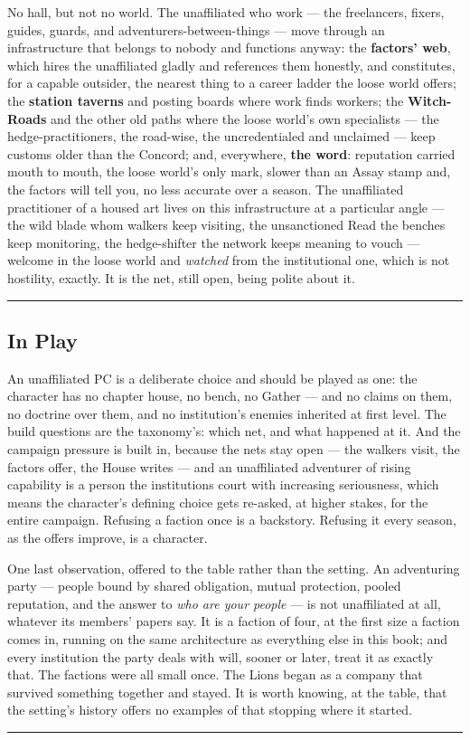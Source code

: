 No hall, but not no world. The unaffiliated who work --- the freelancers, fixers, guides, guards, and adventurers-between-things --- move through an infrastructure that belongs to nobody and functions anyway: the \textbf{factors' web}, which hires the unaffiliated gladly and references them honestly, and constitutes, for a capable outsider, the nearest thing to a career ladder the loose world offers; the \textbf{station taverns} and posting boards where work finds workers; the \textbf{Witch-Roads} and the other old paths where the loose world's own specialists --- the hedge-practitioners, the road-wise, the uncredentialed and unclaimed --- keep customs older than the Concord; and, everywhere, \textbf{the word}: reputation carried mouth to mouth, the loose world's only mark, slower than an Assay stamp and, the factors will tell you, no less accurate over a season. The unaffiliated practitioner of a housed art lives on this infrastructure at a particular angle --- the wild blade whom walkers keep visiting, the unsanctioned Read the benches keep monitoring, the hedge-shifter the network keeps meaning to vouch --- welcome in the loose world and \textit{watched} from the institutional one, which is not hostility, exactly. It is the net, still open, being polite about it.

\medskip\hrule\medskip

\subsection{In Play}

An unaffiliated PC is a deliberate choice and should be played as one: the character has no chapter house, no bench, no Gather --- and no claims on them, no doctrine over them, and no institution's enemies inherited at first level. The build questions are the taxonomy's: which net, and what happened at it. And the campaign pressure is built in, because the nets stay open --- the walkers visit, the factors offer, the House writes --- and an unaffiliated adventurer of rising capability is a person the institutions court with increasing seriousness, which means the character's defining choice gets re-asked, at higher stakes, for the entire campaign. Refusing a faction once is a backstory. Refusing it every season, as the offers improve, is a character.

One last observation, offered to the table rather than the setting. An adventuring party --- people bound by shared obligation, mutual protection, pooled reputation, and the answer to \textit{who are your people} --- is not unaffiliated at all, whatever its members' papers say. It is a faction of four, at the first size a faction comes in, running on the same architecture as everything else in this book; and every institution the party deals with will, sooner or later, treat it as exactly that. The factions were all small once. The Lions began as a company that survived something together and stayed. It is worth knowing, at the table, that the setting's history offers no examples of that stopping where it started.

\medskip\hrule\medskip
